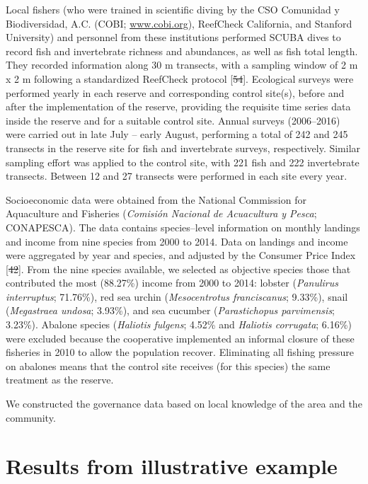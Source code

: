 \documentclass[12pt,]{article}
\providecommand{\DIFaddtex}[1]{{\protect\color{blue}\uwave{#1}}} %
\providecommand{\DIFdeltex}[1]{{\protect\color{red}\sout{#1}}}                      %
\providecommand{\DIFaddbegin}{} %
\providecommand{\DIFaddend}{} %
\providecommand{\DIFdelbegin}{} %
\providecommand{\DIFdelend}{} %
\providecommand{\DIFadd}[1]{\texorpdfstring{\DIFaddtex{#1}}{#1}} %
\providecommand{\DIFdel}[1]{\texorpdfstring{\DIFdeltex{#1}}{}} %
\newcommand{\DIFscaledelfig}{0.5}
\newlength{\DIFdelgraphicswidth} %
\newlength{\DIFdelgraphicsheight} %
\newcommand{\DIFaddincludegraphics}[2][]{{\color{blue}\fbox{\DIFOincludegraphics[#1]{#2}}}} %
\newcommand{\DIFdelincludegraphics}[2][]{%
\sbox{\DIFdelgraphicsbox}{\DIFOincludegraphics[#1]{#2}}%
\settoboxwidth{\DIFdelgraphicswidth}{\DIFdelgraphicsbox} %
\settoboxtotalheight{\DIFdelgraphicsheight}{\DIFdelgraphicsbox} %
\scalebox{\DIFscaledelfig}{%
\parbox[b]{\DIFdelgraphicswidth}{\usebox{\DIFdelgraphicsbox}\\[-\baselineskip] \rule{\DIFdelgraphicswidth}{0em}}\llap{\resizebox{\DIFdelgraphicswidth}{\DIFdelgraphicsheight}{%
\setlength{\unitlength}{\DIFdelgraphicswidth}%
\begin{picture}(1,1)%
\thicklines\linethickness{2pt} %
{\color[rgb]{1,0,0}\put(0,0){\framebox(1,1){}}}%
{\color[rgb]{1,0,0}\put(0,0){\line( 1,1){1}}}%
{\color[rgb]{1,0,0}\put(0,1){\line(1,-1){1}}}%
\end{picture}%
}\hspace*{3pt}}} %
} %
\DeclareRobustCommand{\DIFaddbegin}{\DIFOaddbegin \let\includegraphics\DIFaddincludegraphics} %
\DeclareRobustCommand{\DIFaddend}{\DIFOaddend \let\includegraphics\DIFOincludegraphics} %
\DeclareRobustCommand{\DIFdelbegin}{\DIFOdelbegin \let\includegraphics\DIFdelincludegraphics} %
\DeclareRobustCommand{\DIFdelend}{\DIFOaddend \let\includegraphics\DIFOincludegraphics} %
\begin{document}
Local fishers (who were trained in scientific diving by the CSO
Comunidad y Biodiversidad, A.C. (COBI; \url{www.cobi.org}), ReefCheck
California, and Stanford University) and personnel from these
institutions performed SCUBA dives to record fish and invertebrate
richness and abundances, as well as fish total length. They recorded
information along 30 m transects, with a sampling window of 2 m x 2 m
following a standardized ReefCheck protocol {[}\DIFdelbegin \DIFdel{54}\DIFdelend \DIFaddbegin \DIFadd{60}\DIFaddend {]}. Ecological surveys
were performed yearly in each reserve and corresponding control site(s),
before and after the implementation of the reserve, providing the
requisite time series data inside the reserve and for a suitable control
site. Annual surveys (2006--2016) were carried out in late July -- early
August, performing a total of 242 and 245 transects in the reserve site
for fish and invertebrate surveys, respectively. Similar sampling effort
was applied to the control site, with 221 fish and 222 invertebrate
transects. Between 12 and 27 transects were performed in each site every
year.

Socioeconomic data were obtained from the National Commission for
Aquaculture and Fisheries (\emph{Comisión Nacional de Acuacultura y
Pesca}; CONAPESCA). The data contains species--level information on
monthly landings and income from nine species from 2000 to 2014. Data on
landings and income were aggregated by year and species, and adjusted by
the Consumer Price Index {[}\DIFdelbegin \DIFdel{42}\DIFdelend \DIFaddbegin \DIFadd{48}\DIFaddend {]}. From the nine species available, we
selected as objective species those that contributed the most (88.27\%)
income from 2000 to 2014: lobster (\emph{Panulirus interruptus};
71.76\%), red sea urchin (\emph{Mesocentrotus franciscanus}; 9.33\%),
snail (\emph{Megastraea undosa}; 3.93\%), and sea cucumber
(\emph{Parastichopus parvimensis}; 3.23\%). Abalone species
(\emph{Haliotis fulgens}; 4.52\% and \emph{Haliotis corrugata}; 6.16\%)
were excluded because the cooperative implemented an informal closure of
these fisheries in 2010 to allow the population recover. Eliminating all
fishing pressure on abalones means that the control site receives (for
this species) the same treatment as the reserve.

We constructed the governance data based on local knowledge of the area
and the community.

\section{Results from illustrative
example}\label{results-from-illustrative-example}
\end{document}
